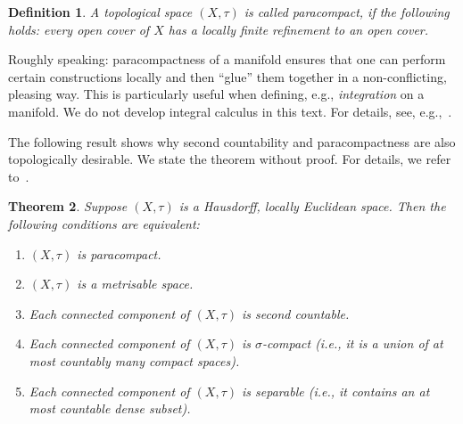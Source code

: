 \documentclass[11pt,a4paper,twoside,openany]{report}
\theoremstyle{my-theorem}
\newtheorem{theorem}{Theorem}[section]
\theoremstyle{non-theorem}
\newtheorem{definition}[theorem]{Definition}
\begin{document}
		\begin{definition}
			A topological space $(X, \tau)$ is called \emph{paracompact}, if the following holds: every open cover of $X$ has a locally finite refinement to an open cover.
		\end{definition}
		
		Roughly speaking: paracompactness of a manifold ensures that one can perform certain constructions locally and then ``glue'' them together in a non-conflicting, pleasing way. This is particularly useful when defining, e.g., \emph{integration} on a manifold. We do not develop integral calculus in this text. For details, see, e.g.,~\cite{lee:manifolds-and-differential-geometry}.
		
		The following result shows why second countability and paracompactness are also topologically desirable. We state the theorem without proof. For details, we refer to~\cite{engelking:general-topology}.
		\begin{theorem}
			Suppose $(X,\tau)$ is a Hausdorff, locally Euclidean space. Then the following conditions are equivalent:
			\begin{enumerate}[label=\rm(\roman*)]
				\item $(X,\tau)$ is paracompact.
				\item $(X,\tau)$ is a metrisable space.
				\item Each connected component of $(X,\tau)$ is second countable.
				\item Each connected component of $(X,\tau)$ is $\sigma$-compact (i.e., it is a union of at most countably many compact spaces).
				\item Each connected component of $(X,\tau)$ is separable (i.e., it contains an at most countable dense subset).
			\end{enumerate}
		\end{theorem}
		
\end{document}
